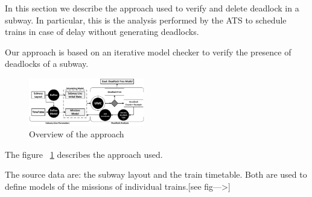 



In this section we describe the approach used to verify and delete deadlock in a subway.
In particular, this is the analysis performed by the ATS to schedule trains in case of delay without generating deadlocks.


Our approach is based on an iterative model checker to verify the presence of deadlocks of a subway.

\begin{figure}[htp]
	\begin{centering}	
	\includegraphics[width=0.45\textwidth, clip]{img/processo}
	\caption{Overview of the approach}
	\label{fig:process}
	\end{centering}
\end{figure}

The figure ~\ref{fig:process} describes the approach used.


The source data are: the subway  layout and the train timetable. Both are used to define models of the missions of individual trains.[see fig--->]



